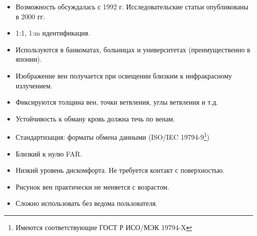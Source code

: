 \begin{frame}[allowframebreaks]
\begin{itemize}
    \item Возможность обсуждалась с 1992 г. Исследовательские статьи опубликованы в 2000 гг. 
    \item 1:1, 1:m идентификация.
    \item Используются в банкоматах, больницах и университетах (преимущественно в японии).
    \item Изображение вен получается при освещении близким к инфракрасному излучением.
    \item Фиксируются толщина вен, точки ветвления, углы ветвления и т.д.
    \item Устойчивость к обману кровь должна течь по венам.
    \item Стандартизация: форматы обмена данными (ISO/IEC 19794-9\footnote{Имеются соответствующие ГОСТ Р ИСО/МЭК 19794-X}) 
    \item Близкий к нулю FAR.
    \item Низкий уровень дискомфорта. Не требуется контакт с поверхностью.
    \item Рисунок вен практически не меняется с возрастом.
    \item Сложно использовать без ведома пользователя.
\end{itemize}
\end{frame}


